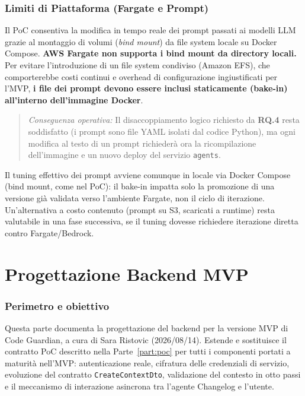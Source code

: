 \documentclass[11pt,a4paper]{article}
\begin{document}
\section{Limiti di Piattaforma (Fargate e Prompt)}
\label{sec:aws-limiti-piattaforma}

Il PoC consentiva la modifica in tempo reale dei prompt passati ai modelli LLM grazie al montaggio di volumi (\emph{bind mount}) da file system locale su Docker Compose. \textbf{AWS Fargate non supporta i bind mount da directory locali.} Per evitare l'introduzione di un file system condiviso (Amazon EFS), che comporterebbe costi continui e overhead di configurazione ingiustificati per l'MVP, \textbf{i file dei prompt devono essere inclusi staticamente (bake-in) all'interno dell'immagine Docker}.

\begin{quote}
\emph{Conseguenza operativa:} Il disaccoppiamento logico richiesto da \textbf{RQ.4} resta soddisfatto (i prompt sono file YAML isolati dal codice Python), ma ogni modifica al testo di un prompt richiederà ora la ricompilazione dell'immagine e un nuovo deploy del servizio \texttt{agents}.
\end{quote}

Il tuning effettivo dei prompt avviene comunque in locale via Docker Compose (bind mount, come nel PoC): il bake-in impatta solo la promozione di una versione già validata verso l'ambiente Fargate, non il ciclo di iterazione. Un'alternativa a costo contenuto (prompt su S3, scaricati a runtime) resta valutabile in una fase successiva, se il tuning dovesse richiedere iterazione diretta contro Fargate/Bedrock.


\part{Progettazione Backend MVP}
\label{part:backend-mvp}

\section{Perimetro e obiettivo}
\label{sec:be-perimetro}

Questa parte documenta la progettazione del backend per la versione MVP di Code Guardian, a cura di Sara Ristovic (2026/08/14). Estende e sostituisce il contratto PoC descritto nella Parte~\ref{part:poc} per tutti i componenti portati a maturità nell'MVP: autenticazione reale, cifratura delle credenziali di servizio, evoluzione del contratto \texttt{CreateContextDto}, validazione del contesto in otto passi e il meccanismo di interazione asincrona tra l'agente Changelog e l'utente.
\end{document}
